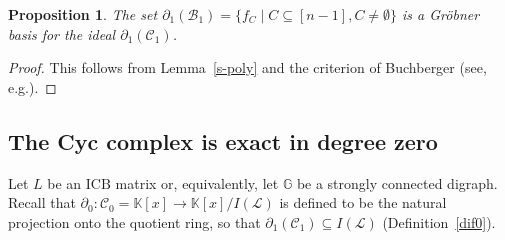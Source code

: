 \documentclass[10pt]{amsart}
\newcommand{\eg}{e.g.}
\newcommand{\mbk}{\mbox{$\mathbb{K}$}}
\newcommand{\mbg}{\mbox{$\mathbb{G}$}}
\newcommand{\mcb}{\mbox{$\mathcal{B}$}}
\newcommand{\mcc}{\mbox{$\mathcal{C}$}}
\newcommand{\mcl}{\mbox{$\mathcal{L}$}}
\newcommand{\icb}{\mbox{$\mathrm{ICB}$}}
\newcommand{\dif}{\mbox{$\partial$}}
\newtheorem{proposition}[cdrthm]{Proposition}
\theoremstyle{definition}
\theoremstyle{remark}
\begin{document}
\begin{proposition}\label{GB1}
The set $\dif_1(\mcb_1)=\{f_C\mid C\subseteq [n-1],
C\neq\emptyset\}$ is a Gr\"obner basis for the ideal
$\dif_1(\mcc_1)$.
\end{proposition}
\begin{proof}
This follows from Lemma~\ref{s-poly} and the criterion of Buchberger
(see, \eg \cite[\S~2.6, Theorem~6 and \S~2.9, Theorem~3]{clo}).
\end{proof}

\subsection{The Cyc complex is exact in degree zero}\label{exact-degree0}

 Let $L$ be an $\icb$ matrix or, equivalently, let $\mbg$ be
a strongly connected digraph.  Recall that $\dif_0:\mcc_0=\mbk[x]\to
\mbk[x]/I(\mcl)$ is defined to be the natural projection onto the
quotient ring, so that $\dif_1(\mcc_1)\subseteq I(\mcl)$
(Definition~\ref{dif0}).
\end{document}
